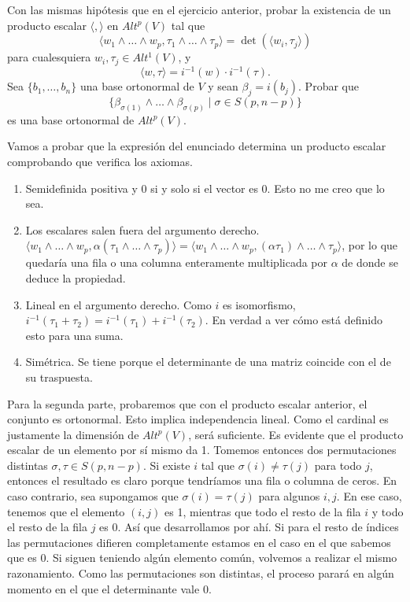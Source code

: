 \documentclass[twoside]{article}
\begin{document}
\newpage

\begin{ejercicio}{5}
Con las mismas hipótesis que en el ejercicio anterior, probar la existencia de un producto escalar $\langle,\rangle$ en $Alt^p(V)$ tal que
$$\langle w_1\land\dots\land w_p,\tau_1\land\dots\land\tau_p\rangle=\det(\langle w_i,\tau_j\rangle)$$
para cualesquiera $w_i,\tau_j\in Alt^1(V)$, y 
$$\langle w,\tau\rangle=i^{-1}(w)\cdot i^{-1}(\tau).$$
Sea $\{b_1,\dots, b_n\}$ una base ortonormal de $V$ y sean $\beta_j=i(b_j)$. Probar que
$$\{\beta_{\sigma(1)}\land\dots\land\beta_{\sigma(p)}\mid \sigma\in S(p,n-p)\}$$
es una base ortonormal de $Alt^p(V)$.
\end{ejercicio}
\begin{solucion}
Vamos a probar que la expresión del enunciado determina un producto escalar comprobando que verifica los axiomas.
\begin{enumerate}
\item Semidefinida positiva y 0 si y solo si el vector es 0. Esto no me creo que lo sea.
\item Los escalares salen fuera del argumento derecho. $\langle w_1\land\dots\land w_p,\alpha(\tau_1\land\dots\land\tau_p)\rangle=\langle w_1\land\dots\land w_p,(\alpha\tau_1)\land\dots\land\tau_p\rangle$, por lo que quedaría una fila o una columna enteramente multiplicada por $\alpha$ de donde se deduce la propiedad.
\item Lineal en el argumento derecho. Como $i$ es isomorfismo, $i^{-1}(\tau_1+\tau_2)=i^{-1}(\tau_1)+i^{-1}(\tau_2)$. En verdad a ver cómo está definido esto para una suma.
\item Simétrica. Se tiene porque el determinante de una matriz coincide con el de su traspuesta.
\end{enumerate}

Para la segunda parte, probaremos que con el producto escalar anterior, el conjunto es ortonormal. Esto implica independencia lineal. Como el cardinal es justamente la dimensión de $Alt^p(V)$, será suficiente. Es evidente que el producto escalar de un elemento por sí mismo da 1. Tomemos entonces dos permutaciones distintas $\sigma,\tau\in S(p,n-p)$. Si existe $i$ tal que $\sigma(i)\neq\tau(j)$ para todo $j$, entonces el resultado es claro porque tendríamos una fila o columna de ceros. En caso contrario, sea supongamos que $\sigma(i)=\tau(j)$ para algunos $i,j$. En ese caso, tenemos que el elemento $(i,j)$ es 1, mientras que todo el resto de la fila $i$ y todo el resto de la fila $j$ es 0. Así que desarrollamos por ahí. Si para el resto de índices las permutaciones difieren completamente estamos en el caso en el que sabemos que es 0. Si siguen teniendo algún elemento común, volvemos a realizar el mismo razonamiento. Como las permutaciones son distintas, el proceso parará en algún momento en el que el determinante vale 0.
\end{solucion}
\end{document}
